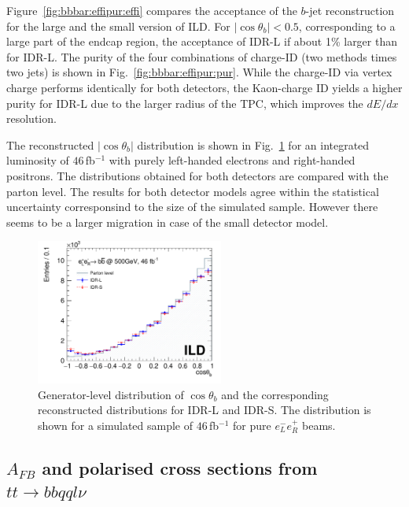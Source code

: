 Figure~\ref{fig:bbbar:effipur:effi} compares the acceptance of the $b$-jet reconstruction for the large and the small version of ILD.
For $|\cos{\theta_b}|<0.5$, corresponding to a large part of the endcap 
region, the acceptance of IDR-L if about 1\% larger than for IDR-L. The purity of the four combinations of charge-ID (two methods times two jets) is shown in Fig.~\ref{fig:bbbar:effipur:pur}. While the charge-ID via vertex charge performs identically for both detectors, the Kaon-charge ID yields a higher purity for IDR-L due to the larger radius of the TPC, which improves the $dE/dx$ resolution. 

The reconstructed  $|\cos{\theta_b}|$ distribution is shown in Fig.~\ref{fig:bbbar:result} for an integrated luminosity of $46$\,fb$^{-1}$ with purely left-handed electrons and right-handed positrons. The distributions obtained for both detectors are compared with the parton level. The results for both detector models agree within the statistical uncertainty corresponsind to the size of the simulated sample. However there seems to be a larger migration in case of the small detector model.


\begin{figure}[htbp]
\begin{center} \includegraphics[width=0.55\textwidth]{Performance/fig/result2models_v3.pdf}
\end{center}
\caption{Generator-level distribution of $\cos{\theta_b}$ and the corresponding reconstructed distributions for IDR-L and IDR-S. The distribution is shown for a simulated sample of $46$\,fb$^{-1}$ for pure $e^-_L e^+_R$ beams.}
\label{fig:bbbar:result}
\end{figure}

\subsection{\texorpdfstring{$A_{FB}$ and polarised cross sections from $tt \to bb qql\nu$}{AFB and ALR from tt -> bbqqlv}}
\label{subsec:bench:ttbar}

